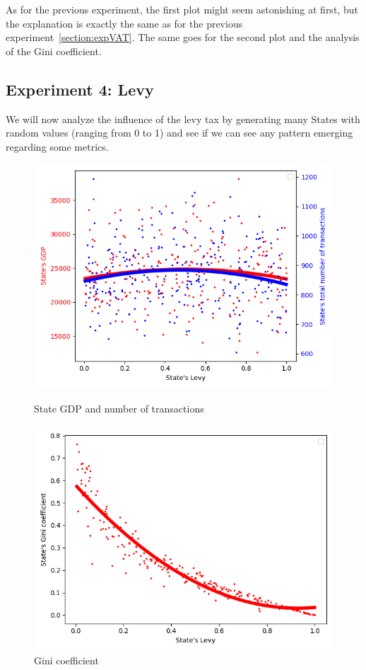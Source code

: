 {{        As for the previous experiment, the first plot might seem astonishing at first, but the explanation is exactly the same as for the previous experiment~\ref{section:expVAT}. The same goes for the second plot and the analysis of the Gini coefficient.


    \subsection{Experiment 4: Levy}
    We will now analyze the influence of the levy tax by generating many States with random values (ranging from 0 to 1) and see if we can see any pattern emerging regarding some metrics. 

        \begin{figure}[H]
                \includegraphics[width=\linewidth]{img/exp/4_1.png}
                \caption{State GDP and number of transactions}
            \endminipage\hfill
                \includegraphics[width=\linewidth]{img/exp/4_3.png}
                \caption{Gini coefficient}
            \endminipage\hfill
        \end{figure}

}}
